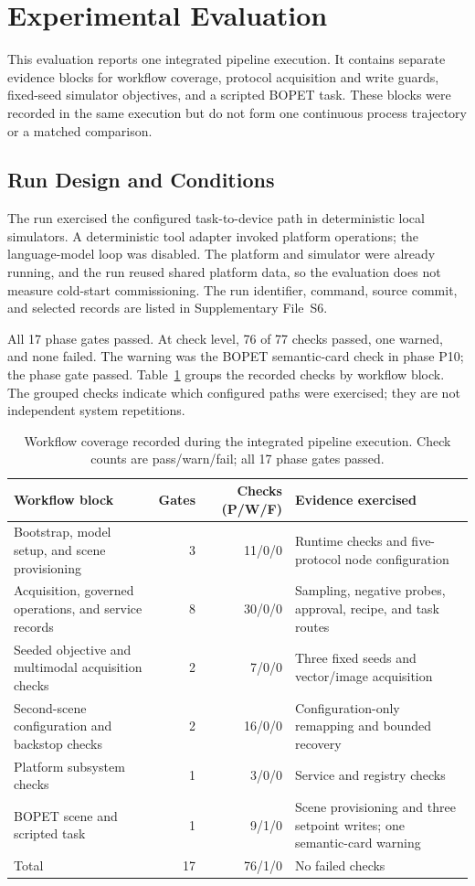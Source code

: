 \section{Experimental Evaluation}
\label{sec:eval}
This evaluation reports one integrated pipeline execution. It contains
separate evidence blocks for workflow coverage, protocol acquisition and
write guards, fixed-seed simulator objectives, and a scripted BOPET task.
These blocks were recorded in the same execution but do not form one
continuous process trajectory or a matched comparison.

\subsection{Run Design and Conditions}
\label{sec:eval-protocol}
The run exercised the configured task-to-device path in deterministic local
simulators. A deterministic tool adapter invoked platform operations; the
language-model loop was disabled. The platform and simulator were already
running, and the run reused shared platform data, so the evaluation does not
measure cold-start commissioning. The run identifier, command, source commit,
and selected records are listed in Supplementary File~S6.

All 17 phase gates passed. At check level, 76 of 77 checks passed, one warned,
and none failed. The warning was the BOPET semantic-card check in phase P10;
the phase gate passed. Table~\ref{tab:workflow-coverage} groups the recorded
checks by workflow block. The grouped checks indicate which configured paths
were exercised; they are not independent system repetitions.

\begin{table}[!t]
\centering
\caption{Workflow coverage recorded during the integrated pipeline
execution. Check counts are pass/warn/fail; all 17 phase gates passed.}
\label{tab:workflow-coverage}
\footnotesize
\setlength{\tabcolsep}{5pt}
\begin{tabularx}{\textwidth}{@{}>{\raggedright\arraybackslash}p{}r r X@{}}
\toprule
Workflow block & Gates & Checks (P/W/F) & Evidence exercised\\
\midrule
Bootstrap, model setup, and scene provisioning & 3 & 11/0/0 & Runtime checks and five-protocol node configuration\\
Acquisition, governed operations, and service records & 8 & 30/0/0 & Sampling, negative probes, approval, recipe, and task routes\\
Seeded objective and multimodal acquisition checks & 2 & 7/0/0 & Three fixed seeds and vector/image acquisition\\
Second-scene configuration and backstop checks & 2 & 16/0/0 & Configuration-only remapping and bounded recovery\\
Platform subsystem checks & 1 & 3/0/0 & Service and registry checks\\
BOPET scene and scripted task & 1 & 9/1/0 & Scene provisioning and three setpoint writes; one semantic-card warning\\
\midrule
Total & 17 & 76/1/0 & No failed checks\\
\bottomrule
\end{tabularx}
\end{table}

